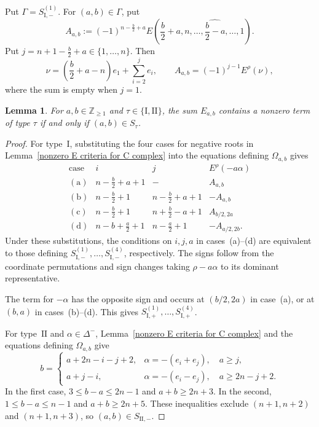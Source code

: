 \documentclass[11pt,a4paper]{amsart}
\newcommand{\ZZ}{\mathbb Z}
\theoremstyle{plain}
\newtheorem{lem}[theorem]{Lemma}
\numberwithin{equation}{section}
\newenvironment{pf}{\begin{proof}}{\end{proof}}
\begin{document}
Put \(\Gamma=S_{\mathrm I,-}^{(1)}\).
For \((a,b)\in\Gamma\), put
\[
A_{a,b}
:=(-1)^{n-\frac b2+a}
E\!\left(
\frac b2+a,n,\dots,
\widehat{\frac b2-a},\dots,1
\right).
\]
Put \(j=n+1-\tfrac b2+a\in\{1,\ldots,n\}\). Then
\[
\nu=\left(\frac b2+a-n\right)e_1+\sum_{i=2}^{j}e_i,
\qquad
A_{a,b}=(-1)^{j-1}E^\rho(\nu),
\]
where the sum is empty when \(j=1\).

\begin{lem}\label{EPI=0 for C}
For \(a,b\in\ZZ_{\ge1}\) and
\(\tau\in\{\mathrm I,\mathrm{II}\}\), the sum \(E_{a,b}\)
contains a nonzero term of type \(\tau\) if and only if
\((a,b)\in S_\tau\).
\end{lem}
\begin{pf}
For type~\(\mathrm I\), substituting the four cases for negative
roots in Lemma~\ref{nonzero E criteria for C complex}
into the equations defining \(\Omega_{a,b}\) gives
\[
\begin{array}{c|c|c|c}
\text{case}&i&j&E^\rho(-a\alpha)\\ \hline
\mathrm{(a)}&n-\frac b2+a+1&-&A_{a,b}\\
\mathrm{(b)}&n-\frac b2+1&n-\frac b2+a+1&-A_{a,b}\\
\mathrm{(c)}&n-\frac b2+1&n+\frac b2-a+1&A_{b/2,2a}\\
\mathrm{(d)}&n-b+\frac a2+1&n-\frac a2+1&-A_{a/2,2b}.
\end{array}
\]
Under these substitutions, the conditions on \(i,j,a\) in
cases~(a)--(d) are equivalent to those defining
\(S_{\mathrm{I},-}^{(1)},\ldots,S_{\mathrm{I},-}^{(4)}\),
respectively.
The signs follow from the coordinate permutations and sign
changes taking \(\rho-a\alpha\) to its dominant representative.

The term for \(-\alpha\) has the opposite sign and occurs at
\((b/2,2a)\) in case~(a), or at \((b,a)\) in cases~(b)--(d).
This gives \(S_{\mathrm{I},+}^{(1)},\ldots,S_{\mathrm{I},+}^{(4)}\).

For type~\(\mathrm{II}\) and \(\alpha\in\Delta^-\),
Lemma~\ref{nonzero E criteria for C complex} and the equations
defining \(\Omega_{a,b}\) give
\[
b=
\begin{cases}
a+2n-i-j+2,
&\alpha=-(e_i+e_j),\quad a\ge j,\\
a+j-i,
&\alpha=-(e_i-e_j),\quad a\ge2n-j+2.
\end{cases}
\]
In the first case, \(3\le b-a\le2n-1\) and
\(a+b\ge2n+3\). In the second, \(1\le b-a\le n-1\) and
\(a+b\ge2n+5\). These inequalities exclude
\((n+1,n+2)\) and \((n+1,n+3)\), so
\((a,b)\in S_{\mathrm{II},-}\).


\end{pf}
\end{document}
